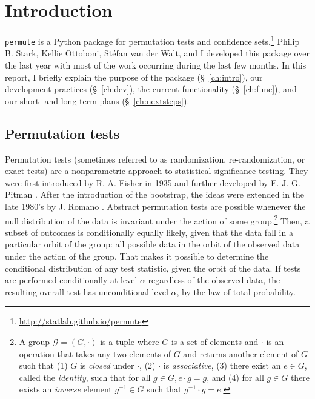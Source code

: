 \chapter{\label{ch:intro}Introduction}

\texttt{permute} is a Python package for permutation tests and confidence
sets.\footnote{\url{http://statlab.github.io/permute}} Philip B. Stark, Kellie
Ottoboni, St\'{e}fan van der Walt, and I developed this package over the last
year with most of the work occurring during the last few months.  In this
report, I briefly explain the purpose of the package (\S~\ref{ch:intro}), our
development practices (\S~\ref{ch:dev}), the current functionality
(\S~\ref{ch:func}), and our short- and long-term plans (\S~\ref{ch:nextsteps}).

\section{Permutation tests}

Permutation tests (sometimes referred to as randomization, re-randomization, or
exact tests) are a nonparametric approach to statistical significance testing.
They were first introduced by R. A. Fisher in 1935 \cite{fisher1935design} and
further developed by E. J. G. Pitman  \cite{pitman1937,
pitman1938significance}.  After the introduction of the bootstrap, the ideas
were extended in the late 1980's by J. Romano \cite{romano1988bootstrap,
romano1989bootstrap}.
Abstract permutation tests are possible whenever the
null distribution of the data is invariant under the action of some group.\footnote{A group $\mathcal{G} = (G, \cdot)$ is a tuple
where $G$ is a set of elements and $\cdot$ is an operation that takes any two elements
of $G$ and returns another element of $G$ such that (1) $G$ is \emph{closed} under $\cdot$,
(2) $\cdot$ is \emph{associative}, (3) there exist an $e \in G$, called the \emph{identity}, such that
for all $g \in G, e\cdot g = g$, and (4) for all $g \in G$ there exists an \emph{inverse}
element $g^{-1} \in G$ such that $g^{-1}\cdot g = e$.}
Then, a subset of outcomes is conditionally equally likely, given that the data
fall in a particular orbit of the group: all possible data in the orbit of the
observed data under the action of the group. That makes it possible to
determine the conditional distribution of any test statistic, given the orbit
of the data.  If tests are performed conditionally at level $\alpha$ regardless
of the observed data, the resulting overall test has unconditional level
$\alpha$, by the law of total probability.

